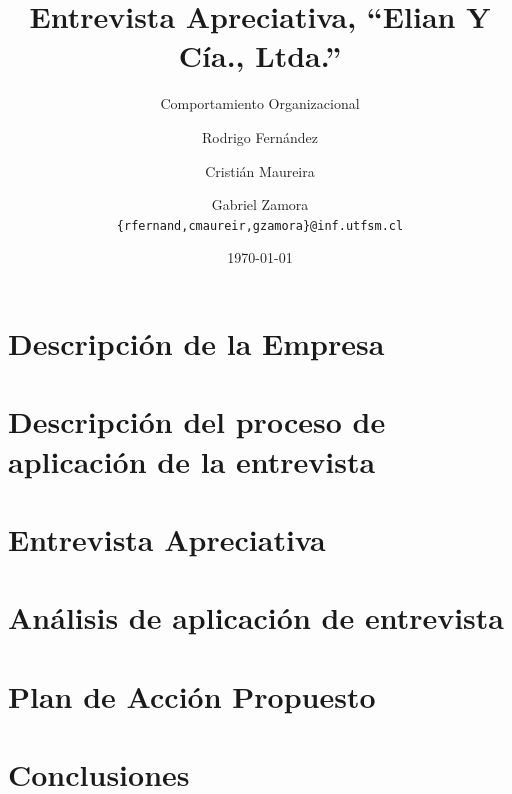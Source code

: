 \documentclass{beamer}
\title{Entrevista Apreciativa, ``Elian Y Cía., Ltda.''}
\subtitle{Comportamiento Organizacional}
\author[R. Fernández, C. Maureira, G. Zamora]{Rodrigo Fernández \and Cristián Maureira \and Gabriel Zamora\\ \small{\texttt{\{rfernand,cmaureir,gzamora\}@inf.utfsm.cl}}}
\institute[]{Universidad Técnica Federico Santa María}
\date{\today}
\begin{document}
    \frame{\titlepage}
    \frame{\tableofcontents}
	\section{Descripción de la Empresa}
		
	\section{Descripción del proceso de aplicación de la entrevista}
	
	\section{Entrevista Apreciativa}
	
	\section{Análisis de aplicación de entrevista}
	
	\section{Plan de Acción Propuesto}
	
	\section{Conclusiones}
	
%	
\end{document}
